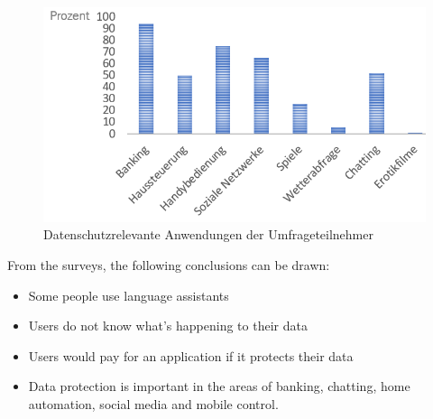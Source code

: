 \begin{figure}[h]
	\centering
	\includegraphics[width=0.9\linewidth]{Picture/umfrage_anwendung}
	\caption[Datenschutzrelevante Anwendungen der Umfrageteilnehmers]{Datenschutzrelevante Anwendungen der Umfrageteilnehmer}
	\label{fig:umfrage_anwendung}
\end{figure}

From the surveys, the following conclusions can be drawn:
\begin{itemize}	
	\item Some people use language assistants
	\item Users do not know what's happening to their data
	\item Users would pay for an application if it protects their data
	\item Data protection is important in the areas of banking, chatting, home automation, social media and mobile control.
\end{itemize}

